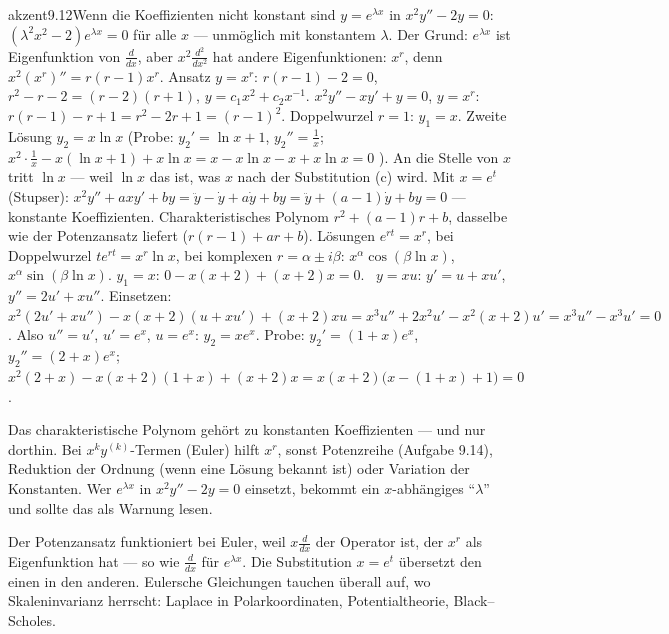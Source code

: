 \begin{loesungkarte}{akzent}{9.12}{Wenn die Koeffizienten nicht konstant sind}
$y = e^{\lambda x}$ in $x^{2}y'' - 2y = 0$: $(\lambda^{2}x^{2} - 2)e^{\lambda x} = 0$ für alle $x$ --- unmöglich mit konstantem $\lambda$. Der Grund: $e^{\lambda x}$ ist Eigenfunktion von $\frac d{dx}$, aber $x^{2}\frac{d^{2}}{dx^{2}}$ hat andere Eigenfunktionen: $x^{r}$, denn $x^{2}(x^{r})'' = r(r - 1)x^{r}$. Ansatz $y = x^{r}$: $r(r - 1) - 2 = 0$, $r^{2} - r - 2 = (r - 2)(r + 1)$, $y = c_1x^{2} + c_2x^{-1}$.
$x^{2}y'' - xy' + y = 0$, $y = x^{r}$: $r(r - 1) - r + 1 = r^{2} - 2r + 1 = (r - 1)^{2}$. Doppelwurzel $r = 1$: $y_1 = x$. Zweite Lösung $y_2 = x\ln x$ (Probe: $y_2' = \ln x + 1$, $y_2'' = \frac1x$; $x^{2}\cdot\frac1x - x(\ln x + 1) + x\ln x = x - x\ln x - x + x\ln x = 0$ \checkmark). An die Stelle von $x$ tritt $\ln x$ --- weil $\ln x$ das ist, was $x$ nach der Substitution (c) wird.
Mit $x = e^{t}$ (Stupser): $x^{2}y'' + axy' + by = \ddot y - \dot y + a\dot y + by = \ddot y + (a - 1)\dot y + by = 0$ --- konstante Koeffizienten. Charakteristisches Polynom $r^{2} + (a - 1)r + b$, dasselbe wie der Potenzansatz liefert ($r(r - 1) + ar + b$). Lösungen $e^{rt} = x^{r}$, bei Doppelwurzel $te^{rt} = x^{r}\ln x$, bei komplexen $r = \alpha\pm i\beta$: $x^{\alpha}\cos(\beta\ln x)$, $x^{\alpha}\sin(\beta\ln x)$.
$y_1 = x$: $0 - x(x + 2) + (x + 2)x = 0$. \checkmark\ $y = xu$: $y' = u + xu'$, $y'' = 2u' + xu''$. Einsetzen: $x^{2}(2u' + xu'') - x(x + 2)(u + xu') + (x + 2)xu = x^{3}u'' + 2x^{2}u' - x^{2}(x + 2)u' = x^{3}u'' - x^{3}u' = 0$. Also $u'' = u'$, $u' = e^{x}$, $u = e^{x}$: $y_2 = xe^{x}$. Probe: $y_2' = (1 + x)e^{x}$, $y_2'' = (2 + x)e^{x}$; $x^{2}(2 + x) - x(x + 2)(1 + x) + (x + 2)x = x(x + 2)\bigl(x - (1 + x) + 1\bigr) = 0$. \checkmark
\begin{fehler}\kastentext
Das charakteristische Polynom gehört zu konstanten Koeffizienten --- und nur dorthin. Bei $x^{k}y^{(k)}$-Termen (Euler) hilft $x^{r}$, sonst Potenzreihe (Aufgabe 9.14), Reduktion der Ordnung (wenn eine Lösung bekannt ist) oder Variation der Konstanten. Wer $e^{\lambda x}$ in $x^{2}y'' - 2y = 0$ einsetzt, bekommt ein $x$-abhängiges \enquote{$\lambda$} und sollte das als Warnung lesen.
\end{fehler}
\begin{mitnehmen}\kastentext
Der Potenzansatz funktioniert bei Euler, weil $x\frac d{dx}$ der Operator ist, der $x^{r}$ als Eigenfunktion hat --- so wie $\frac d{dx}$ für $e^{\lambda x}$. Die Substitution $x = e^{t}$ übersetzt den einen in den anderen. Eulersche Gleichungen tauchen überall auf, wo Skaleninvarianz herrscht: Laplace in Polarkoordinaten, Potentialtheorie, Black--Scholes.
\end{mitnehmen}
\end{loesungkarte}

